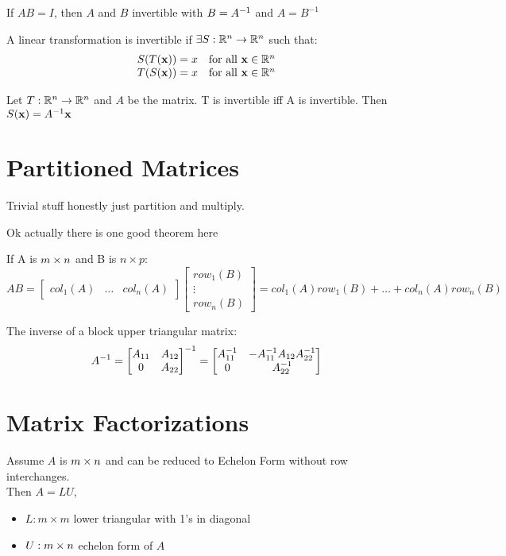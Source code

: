 \documentclass{report}
\begin{document}
If $AB = I$, then $A$ and $B$ invertible with $B = A^{-1}$ and $A = B^{-1}$

A linear transformation is invertible if $\exists S: \mathbb{R}^n \to \mathbb{R}^n$ such that:
\[
\begin{array}{rlr}
    S(T(\mathbf{x})) = x & \text{for all } \mathbf{x} \in \mathbb{R}^n \\
    T(S(\mathbf{x})) = x & \text{for all } \mathbf{x} \in \mathbb{R}^n \\
\end{array}
\]

\begin{theorem}
    Let $T : \mathbb{R}^n \to \mathbb{R}^n$ and $A$ be the matrix. T is invertible iff A is invertible.
    Then $S(\mathbf{x}) = A^{-1} \mathbf{x} $
\end{theorem}

\section{Partitioned Matrices}

Trivial stuff honestly just partition and multiply.

Ok actually there is one good theorem here
\begin{theorem}
If A is $m \times n$ and B is $n \times p$:
\[
AB = \begin{bmatrix}col_1(A) & \ldots & col_n(A)\end{bmatrix} \begin{bmatrix}row_1(B) \\ \vdots \\ row_n(B)\end{bmatrix} = col_1(A) row_1(B) + \ldots + col_n(A) row_n(B) 
\]

The inverse of a block upper triangular matrix:
\[
A^{-1} = \begin{bmatrix}
    A_{11} & A_{12} \\
    0 & A_{22}
\end{bmatrix}^{-1} = \begin{bmatrix}
    A_{11}^{-1} & -A_{11}^{-1}A_{12}A_{22}^{-1} \\
    0 & A_{22}^{-1}
\end{bmatrix}
\]
\end{theorem}

\section{Matrix Factorizations}

Assume $A$ is $m \times n$ and can be reduced to Echelon Form without row interchanges. \\
Then $A = LU$, 
\begin{itemize}
    \item $L: m \times m$ lower triangular with 1's in diagonal
    \item $U: m \times n$ echelon form of $A$
\end{itemize} 
\end{document}
